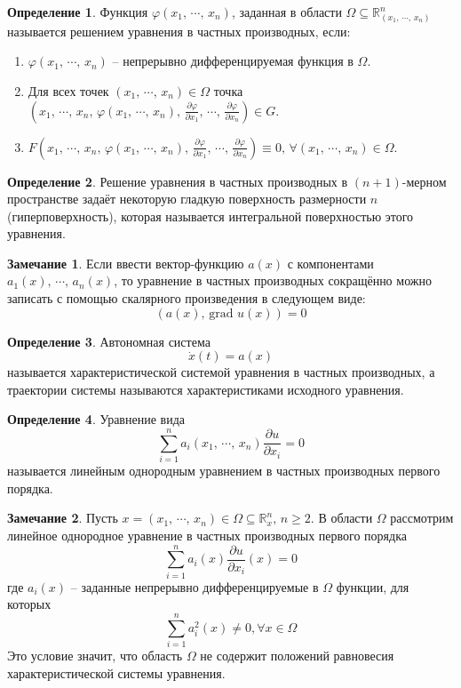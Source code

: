 \documentclass[a4paper,12pt]{article}
\renewcommand{\phi}{\ensuremath{\varphi}}
\renewcommand{\geq}{\ensuremath{\geqslant}}
\theoremstyle{plain}
\theoremstyle{definition}
\newtheorem{definition}{Определение}[section]
\newtheorem*{note}{Замечание}
\theoremstyle{remark}
\begin{document}
\begin{definition}
	Функция $\phi(x_1,\,\cdots,\,x_n)$, заданная  в области $\Omega \subseteq \mathbb{R}^n_{(x_1,\,\cdots,\,x_n)}$ называется решением уравнения в частных производных, если:
	\begin{enumerate}
		\item $\phi(x_1,\,\cdots,\,x_n)$ -- непрерывно дифференцируемая функция в $\Omega$.
		\item Для всех точек $(x_1,\,\cdots,\,x_n) \in \Omega$ точка $(x_1,\,\cdots,\,x_n,\, \phi(x_1,\,\cdots,\,x_n),\, \frac{\partial \phi}{\partial x_1},\,\cdots,\,\frac{\partial \phi}{\partial x_n}) \in G$.
		\item $F(x_1,\,\cdots,\,x_n,\, \phi(x_1,\,\cdots,\,x_n),\, \frac{\partial \phi}{\partial x_1},\,\cdots,\,\frac{\partial \phi}{\partial x_n}) \equiv 0,\, \forall (x_1,\,\cdots,\,x_n) \in \Omega$.
	\end{enumerate}
\end{definition}

\begin{definition}
	Решение уравнения в частных производных в $(n + 1)$-мерном пространстве задаёт некоторую гладкую поверхность размерности $n$ (гиперповерхность), которая называется интегральной поверхностью этого уравнения.
\end{definition}

\begin{note}
	Если ввести вектор-функцию $a(x)$ с компонентами $a_1(x),\,\cdots,\,a_n(x)$, то уравнение в частных производных сокращённо можно записать с помощью скалярного произведения в следующем виде:
	\[(a(x),\, \text{grad }u(x)) = 0\]
\end{note}

\begin{definition}
	Автономная система
	\[\dot{x}(t) = a(x)\]
	называется характеристической системой уравнения в частных производных, а траектории системы называются характеристиками исходного уравнения.
\end{definition}

\begin{definition}
	Уравнение вида 
	\[\sum_{i = 1}^na_i(x_1,\,\cdots,\,x_n)\frac{\partial u}{\partial x_i} = 0\]
	называется линейным однородным уравнением в частных производных первого порядка.
\end{definition}

\begin{note}
	Пусть $x = (x_1,\,\cdots,\,x_n) \in \Omega \subseteq \mathbb{R}^n_x,\, n \geq 2$. В области $\Omega$ рассмотрим линейное однородное уравнение в частных производных первого порядка
	\[\sum_{i = 1}^n a_i(x)\frac{\partial u}{\partial x_i}(x) = 0\]
	где $a_i(x)$ -- заданные непрерывно дифференцируемые в $\Omega$ функции, для которых
	\[\sum_{i = 1}^n a_i^2(x) \neq 0, \forall x \in \Omega\]
	Это условие значит, что область $\Omega$ не содержит положений равновесия характеристической системы уравнения.
\end{note}
\end{document}
